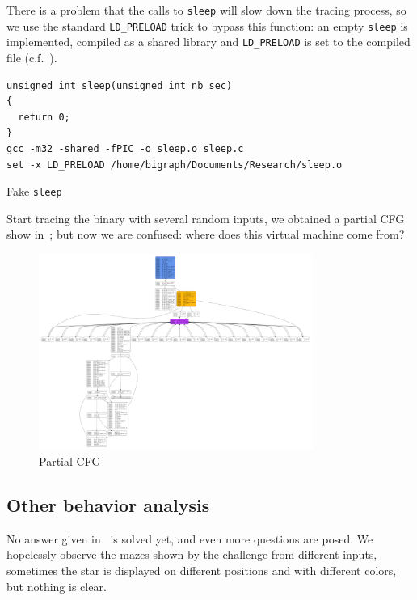 \documentclass{easychair}
\begin{document}
There is a problem that the calls to \texttt{sleep} will slow down the tracing process, so we use the standard \texttt{LD\_PRELOAD} trick to bypass this function: an empty \texttt{sleep} is implemented, compiled as a shared library and \texttt{LD\_PRELOAD} is set to the compiled file (c.f.~).
\begin{listing}
  \begin{verbatim}
unsigned int sleep(unsigned int nb_sec)
{
  return 0;
}
gcc -m32 -shared -fPIC -o sleep.o sleep.c
set -x LD_PRELOAD /home/bigraph/Documents/Research/sleep.o
  \end{verbatim}
  \caption{Fake \texttt{sleep}}
  \label{fig:sleep}
\end{listing}
Start tracing the binary with several random inputs, we obtained a partial CFG show in~; but now we are confused: where does this virtual machine come from? 

\begin{figure}[h]
  \centering
  \includegraphics[width=0.8\textwidth,keepaspectratio]{mecung.pdf}
  \caption{Partial CFG}
  \label{fig:partial_cfg}
\end{figure}

\subsection{Other behavior analysis}
\label{sec:other_behavior_analysis}
No answer given in~ is solved yet, and even more questions are posed. We hopelessly observe the mazes shown by the challenge from different inputs, sometimes the star is displayed on different positions and with different colors, but nothing is clear.
\end{document}
